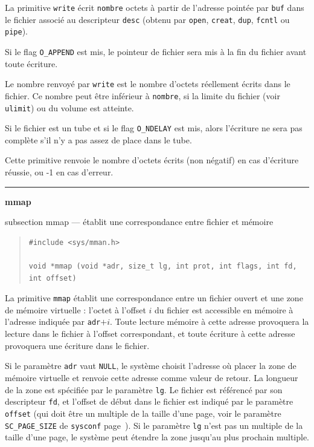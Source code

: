 \documentclass [twoside] {report}
\newcommand {\primitive} [1]
    {
	\phantomsection
	{\large \textbf {#1}}
	\addcontentsline {toc} {subsection} {#1}
    }
\newcommand {\separation}
    {
	\vspace {5mm}
	\nopagebreak
	\hrule
    }
\begin{document}
La primitive \texttt {write} écrit \texttt {nombre} octets à
partir de l'adresse pointée par \texttt {buf} dans le
fichier associé au descripteur \texttt {desc} (obtenu par
\texttt {open}, \texttt {creat}, \texttt {dup}, \texttt {fcntl} ou \texttt {pipe}).

Si le flag \texttt {O\_APPEND} est mis, le pointeur de
fichier sera mis à la fin du fichier avant toute
écriture.

Le nombre renvoyé par \texttt {write} est le nombre
d'octets réellement écrits dans le fichier. Ce
nombre peut être inférieur à \texttt {nombre}, si la
limite du fichier (voir \texttt {ulimit}) ou du volume
est atteinte.

Si le fichier est un tube et si le flag
\texttt {O\_NDELAY} est mis, alors l'écriture ne sera pas
complète s'il n'y a pas assez de place dans le
tube.

Cette primitive renvoie le nombre d'octets écrits
(non négatif) en cas d'écriture
réussie, ou -1 en cas d'erreur.


\separation
\primitive {mmap} --- établit une correspondance entre fichier et mémoire

\begin {quote}
\begin {verbatim}
#include <sys/mman.h>

void *mmap (void *adr, size_t lg, int prot, int flags, int fd, int offset)
\end{verbatim}
\end {quote}

La primitive \texttt {mmap} établit une correspondance entre un fichier
ouvert et une zone de mémoire virtuelle : l'octet à l'offset $i$ du
fichier est accessible en mémoire à l'adresse indiquée par \texttt
{adr}$+i$. Toute lecture mémoire à cette adresse provoquera la lecture
dans le fichier à l'offset correspondant, et toute écriture à cette
adresse provoquera une écriture dans le fichier.

Si le paramètre \texttt {adr} vaut \texttt {NULL}, le système choisit
l'adresse où placer la zone de mémoire virtuelle et renvoie cette
adresse comme valeur de retour. La longueur de la zone est spécifiée
par le paramètre \texttt {lg}. Le fichier est référencé par son
descripteur \texttt {fd}, et l'offset de début dans le fichier est
indiqué par le paramètre \texttt {offset} (qui doit être un multiple
de la taille d'une page, voir le paramètre \texttt {SC\_PAGE\_SIZE}
de \texttt {sysconf} page~\pageref {sysconf}). Si le paramètre \texttt {lg}
n'est pas un multiple de la taille d'une page, le système peut étendre
la zone jusqu'au plus prochain multiple.
\end{document}
